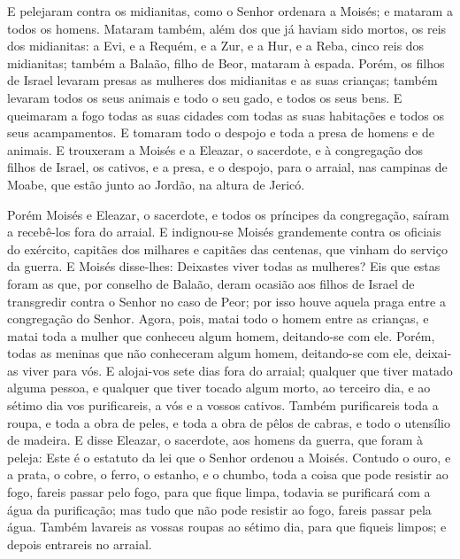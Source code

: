 E pelejaram contra os midianitas, como o Senhor ordenara a Moisés;
e mataram a todos os homens. Mataram também, além dos que já
haviam sido mortos, os reis dos midianitas: a Evi, e a Requém, e a
Zur, e a Hur, e a Reba, cinco reis dos midianitas; também a Balaão,
filho de Beor, mataram à espada. Porém, os filhos de Israel
levaram presas as mulheres dos midianitas e as suas crianças; também
levaram todos os seus animais e todo o seu gado, e todos os seus
bens. E queimaram a fogo todas as suas cidades com todas as
suas habitações e todos os seus acampamentos. E tomaram todo
o despojo e toda a presa de homens e de animais. E trouxeram
a Moisés e a Eleazar, o sacerdote, e à congregação dos filhos de
Israel, os cativos, e a presa, e o despojo, para o arraial, nas
campinas de Moabe, que estão junto ao Jordão, na altura de Jericó.

Porém Moisés e Eleazar, o sacerdote, e todos os príncipes da
congregação, saíram a recebê-los fora do arraial. E
indignou-se Moisés grandemente contra os oficiais do exército,
capitães dos milhares e capitães das centenas, que vinham do serviço
da guerra. E Moisés disse-lhes: Deixastes viver todas as
mulheres? Eis que estas foram as que, por conselho de Balaão,
deram ocasião aos filhos de Israel de transgredir contra o Senhor no
caso de Peor; por isso houve aquela praga entre a congregação do
Senhor. Agora, pois, matai todo o homem entre as crianças, e
matai toda a mulher que conheceu algum homem, deitando-se com ele.
Porém, todas as meninas que não conheceram algum homem,
deitando-se com ele, deixai-as viver para vós. E alojai-vos
sete dias fora do arraial; qualquer que tiver matado alguma pessoa,
e qualquer que tiver tocado algum morto, ao terceiro dia, e ao
sétimo dia vos purificareis, a vós e a vossos cativos. Também
purificareis toda a roupa, e toda a obra de peles, e toda a obra de
pêlos de cabras, e todo o utensílio de madeira. E disse
Eleazar, o sacerdote, aos homens da guerra, que foram à peleja: Este
é o estatuto da lei que o Senhor ordenou a Moisés. Contudo o
ouro, e a prata, o cobre, o ferro, o estanho, e o chumbo,
toda a coisa que pode resistir ao fogo, fareis passar pelo
fogo, para que fique limpa, todavia se purificará com a água da
purificação; mas tudo que não pode resistir ao fogo, fareis passar
pela água. Também lavareis as vossas roupas ao sétimo dia,
para que fiqueis limpos; e depois entrareis no arraial.

